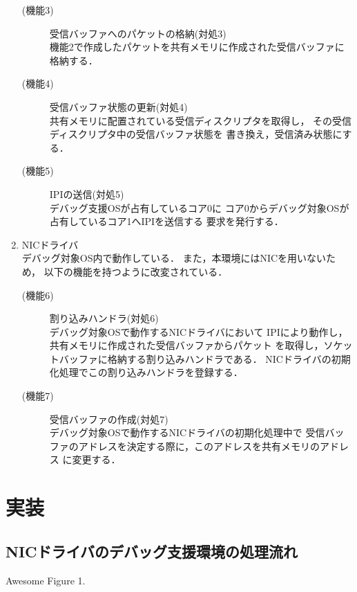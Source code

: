 \documentclass[tanilab-enum]{graduate}
\begin{document}
\begin{enumerate}
\begin{description}
            \item[(機能3)] 受信バッファへのパケットの格納(対処3)\\
                機能2で作成したパケットを共有メモリに作成された受信バッファに格納する．
            \item[(機能4)] 受信バッファ状態の更新(対処4)\\
                共有メモリに配置されている受信ディスクリプタを取得し，
                その受信ディスクリプタ中の受信バッファ状態を
                書き換え，受信済み状態にする．
            \item[(機能5)] IPIの送信(対処5)\\
                デバッグ支援OSが占有しているコア0に
                コア0からデバッグ対象OSが占有しているコア1へIPIを送信する
                要求を発行する．
        \end{description}
    \item NICドライバ\\
        デバッグ対象OS内で動作している．
        また，本環境にはNICを用いないため，
        以下の機能を持つように改変されている．
        \begin{description}
            \item[(機能6)] 割り込みハンドラ(対処6)\\
                デバッグ対象OSで動作するNICドライバにおいて
                IPIにより動作し，共有メモリに作成された受信バッファからパケット
                を取得し，ソケットバッファに格納する割り込みハンドラである．
                NICドライバの初期化処理でこの割り込みハンドラを登録する．
            \item[(機能7)] 受信バッファの作成(対処7)\\
                デバッグ対象OSで動作するNICドライバの初期化処理中で
                受信バッファのアドレスを決定する際に，このアドレスを共有メモリのアドレス
                に変更する．
        \end{description}
\end{enumerate}


\chapter{実装}\label{chap:implementation}
\section{NICドライバのデバッグ支援環境の処理流れ}
{Awesome Figure 1.}
\end{document}
